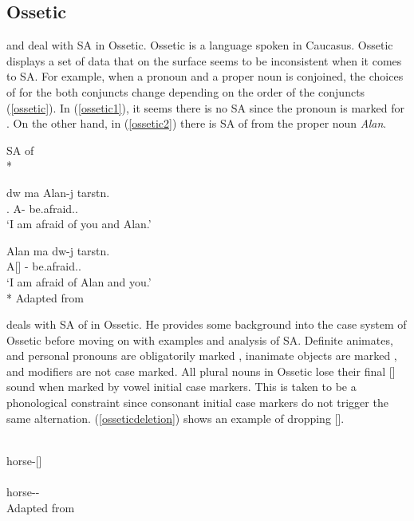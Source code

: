 \subsection{Ossetic}

\citet{erschler2012suspended} and \citet{erschler2018suspended} deal with SA in Ossetic. Ossetic is a language spoken in Caucasus. Ossetic displays a set of data that on the surface seems to be inconsistent when it comes to SA. For example, when a pronoun and a proper noun is conjoined, the choices of {\Case} for the both conjuncts change depending on the order of the conjuncts (\ref{ossetic}). In (\ref{ossetic1}), it seems there is no SA since the pronoun {\Ssg} is marked for {\Obl}. On the other hand, in (\ref{ossetic2}) there is SA of {\Abl} from the proper noun \textit{Alan}.

\begin{exe}
    \ex \label{ossetic} SA of {\Abl}\\*
    \begin{xlist}
        \ex \label{ossetic1} 
        \gll d\textturna w \textturna ma Alan-\textturna j tarst\textturna n. \\
        {\Ssg}.{\Obl} {\And} A-{\Abl} be.afraid.{\Pst}.{\Fsg} \\
        \glt `I am afraid of you and Alan.'
        
        \ex \label{ossetic2} 
        \gll Alan \textturna ma d\textturna w-\textturna j tarst\textturna n. \\
        A[{\Nom}] {\And} {\Ssg}-{\Abl} be.afraid.{\Pst}.{\Fsg} \\
        \glt `I am afraid of Alan and you.'\\*
        \hfill Adapted from \citet{erschler2012suspended}
    \end{xlist}
\end{exe}

\citet{erschler2012suspended} deals with SA of {\Case} in Ossetic. He provides some background into the case system of Ossetic before moving on with examples and analysis of SA. Definite animates, and personal pronouns are obligatorily marked {\Obl}, inanimate objects are marked {\Nom}, and modifiers are not case marked. All plural nouns in Ossetic lose their final [\textturna] sound when marked by vowel initial case markers. This is taken to be a phonological constraint since consonant initial case markers do not trigger the same alternation. (\ref{osseticdeletion}) shows an example of dropping [\textturna].

\begin{exe}
    \ex \label{osseticdeletion}
    \begin{xlist}
        \ex {} \\ horse-{\Pl}[{\Nom}] \\
        
        \ex {} \\ horse-{\Pl}-{\Obl} \\
        \glt \hfill Adapted from \citet{erschler2012suspended}
    \end{xlist}
\end{exe}

